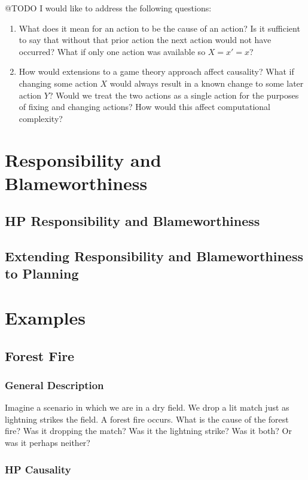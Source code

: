 \documentclass{article}
\theoremstyle{plain}
\theoremstyle{definition}
\begin{document}
@TODO I would like to address the following questions:

\begin{enumerate}
\item What does it mean for an action to be the cause of an action? Is it sufficient to say that without that prior action the next action would not have occurred? What if only one action was available so $X=x'=x$?
\item How would extensions to a game theory approach affect causality? What if changing some action $X$ would always result in a known change to some later action $Y$? Would we treat the two actions as a single action for the purposes of fixing and changing actions? How would this affect computational complexity?
\end{enumerate}



\section{Responsibility and Blameworthiness}
\subsection{HP Responsibility and Blameworthiness}
\subsection{Extending Responsibility and Blameworthiness to Planning}

\fi

\section{Examples}
\subsection{Forest Fire}
\subsubsection*{General Description}
Imagine a scenario in which we are in a dry field. We drop a lit match just as lightning strikes the field. A forest fire occurs. What is the cause of the forest fire? Was it dropping the match? Was it the lightning strike? Was it both? Or was it perhaps neither?

\subsubsection*{HP Causality}
\end{document}
